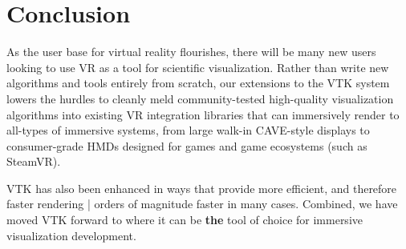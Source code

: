 \section{Conclusion}

As the user base for virtual reality flourishes, there will be many
new users looking to use VR as a tool for scientific visualization.
Rather than write new algorithms and tools entirely from scratch,
our extensions to the VTK system lowers the hurdles to cleanly
meld community-tested high-quality visualization algorithms into
existing VR integration libraries that can immersively render to
all-types of immersive systems, from large walk-in CAVE-style displays
to consumer-grade HMDs designed for games and game ecosystems (such
as SteamVR).

VTK has also been enhanced in ways that provide more efficient, and
therefore faster rendering | orders of magnitude faster in many cases.
Combined, we have moved VTK forward to where it can be \textbf{the}
tool of choice for immersive visualization development.

